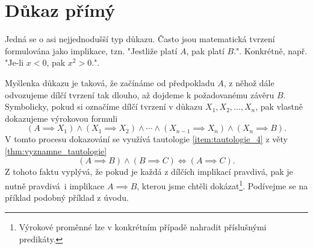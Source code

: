 \section{Důkaz přímý}\label{sec:dukaz_primy}
Jedná se o asi nejjednodušší typ důkazu. Často jsou matematická tvrzení formulována jako implikace, tzn. "Jestliže platí $A$, pak platí $B$.". Konkrétně, např. "Je-li $x<0$, pak $x^2>0$.".\par
Myšlenka důkazu je taková, že začínáme od předpokladu $A$, z něhož dále odvozujeme dílčí tvrzení tak dlouho, až dojdeme k požadovanému závěru $B$. Symbolicky, pokud si označíme dílčí tvrzení v důkazu $X_1, X_2, \dots, X_n$, pak vlastně dokazujeme výrokovou formuli
\begin{equation}\label{eq:primy_dukaz_formule}
    (A \implies X_1) \land (X_1 \implies X_2) \land \cdots \land (X_{n-1}\implies X_n) \land (X_n \implies B).
\end{equation}
V tomto procesu dokazování se využívá tautologie \ref{item:tautologie_4} z věty \ref{thm:vyznamne_tautologie}
\begin{equation*}
    (A \implies B) \land (B \implies C) \iff (A \implies C).
\end{equation*}
Z tohoto faktu vyplývá, že pokud je každá z dílčích implikací pravdivá, pak je nutně pravdivá~i implikace $A \implies B$, kterou jsme chtěli dokázat\footnote{Výrokové proměnné lze v konkrétním případě nahradit příslušnými predikáty.}. Podívejme se na příklad podobný příklad z úvodu.

